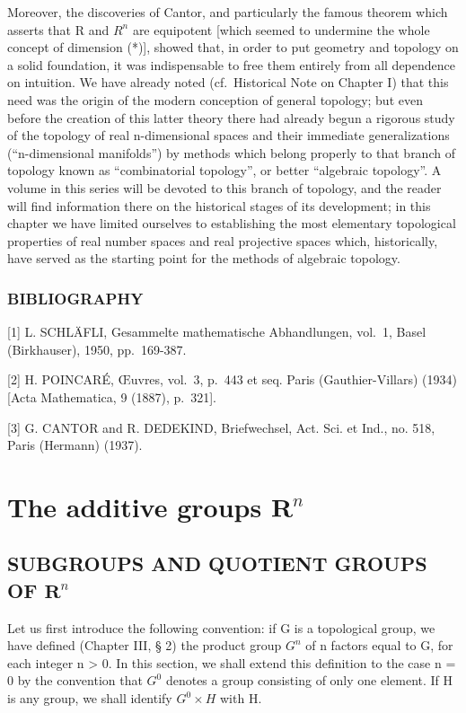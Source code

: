 Moreover, the discoveries of Cantor, and particularly the famous theorem which asserts that R and \(R^{n}\) are equipotent {[}which seemed to undermine the whole concept of dimension (*){]}, showed that, in order to put geometry and topology on a solid foundation, it was indispensable to free them entirely from all dependence on intuition. We have already noted (cf.~Historical Note on Chapter I) that this need was the origin of the modern conception of general topology; but even before the creation of this latter theory there had already begun a rigorous study of the topology of real n-dimensional spaces and their immediate generalizations (``n-dimensional manifolds'') by methods which belong properly to that branch of topology known as ``combinatorial topology'', or better ``algebraic topology''. A volume in this series will be devoted to this branch of topology, and the reader will find information there on the historical stages of its development; in this chapter we have limited ourselves to establishing the most elementary topological properties of real number spaces and real projective spaces which, historically, have served as the starting point for the methods of algebraic topology.

\subsection*{BIBLIOGRAPHY}

{[}1{]} L. SCHLÄFLI, Gesammelte mathematische Abhandlungen, vol.~1, Basel (Birkhauser), 1950, pp.~169-387.

{[}2{]} H. POINCARÉ, Œuvres, vol.~3, p.~443 et seq. Paris (Gauthier-Villars) (1934) {[}Acta Mathematica, 9 (1887), p.~321{]}.

{[}3{]} G. CANTOR and R. DEDEKIND, Briefwechsel, Act. Sci. et Ind., no. 518, Paris (Hermann) (1937).

\chapter{\texorpdfstring{The additive groups \(\mathbf{R}^n\)}{The additive groups R to the n}}

\section{\texorpdfstring{SUBGROUPS AND QUOTIENT GROUPS OF \(\mathbf{R}^n\)}{SUBGROUPS AND QUOTIENT GROUPS OF R TO THE N}}

Let us first introduce the following convention: if G is a topological group, we have defined (Chapter III, § 2) the product group \(G^{n}\) of n factors equal to G, for each integer n \textgreater{} 0. In this section, we shall extend this definition to the case n = 0 by the convention that \(G^{0}\) denotes a group consisting of only one element. If H is any group, we shall identify \(G^{0} \times H\) with H.

